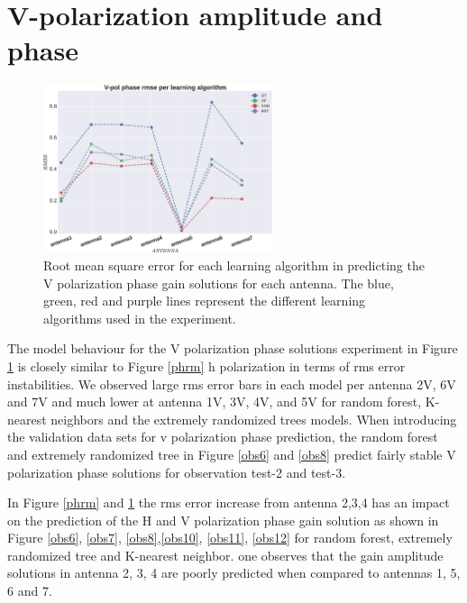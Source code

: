 \section{V-polarization amplitude and phase}
\label{Vp}
\begin{figure}[H]
  \centering
    \includegraphics[width=0.6\textwidth]{images/Vpol-phase.eps}
    \caption{Root mean square error for each learning algorithm in predicting the V polarization phase gain solutions for each antenna. The blue, green, red and purple lines represent the different learning algorithms used in the experiment.}
  \label{phrmv}
 \end{figure}
 
The model behaviour for the V polarization phase solutions experiment in Figure \ref{phrmv} is closely similar to Figure \ref{phrm} h polarization in terms of rms error instabilities. We observed large rms error bars in each model per antenna 2V, 6V and 7V and much lower at antenna 1V, 3V, 4V, and 5V for random forest, K-nearest neighbors and the extremely randomized trees models. When introducing the validation data sets for v polarization phase prediction, the random forest and extremely randomized tree in Figure \ref{obs6} and \ref{obs8} predict fairly stable V polarization phase solutions for observation test-2 and test-3.

In Figure \ref{phrm} and \ref{phrmv} the rms error increase from antenna 2,3,4 has an impact on the prediction of the H and V polarization phase gain solution as shown in Figure \ref{obs6}, \ref{obs7}, \ref{obs8},\ref{obs10}, \ref{obs11}, \ref{obs12} for random forest, extremely randomized tree and K-nearest neighbor. one observes that the gain amplitude solutions in antenna 2, 3, 4 are poorly predicted when compared to antennas 1, 5, 6 and 7. 

